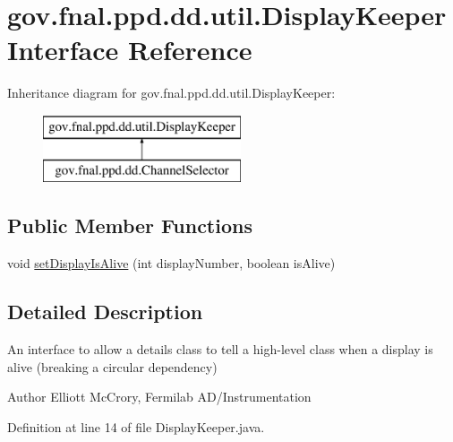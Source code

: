 \hypertarget{interfacegov_1_1fnal_1_1ppd_1_1dd_1_1util_1_1DisplayKeeper}{\section{gov.\-fnal.\-ppd.\-dd.\-util.\-Display\-Keeper Interface Reference}
\label{interfacegov_1_1fnal_1_1ppd_1_1dd_1_1util_1_1DisplayKeeper}
}
Inheritance diagram for gov.\-fnal.\-ppd.\-dd.\-util.\-Display\-Keeper\-:\begin{figure}[H]
\begin{center}
\leavevmode
\includegraphics[height=2.000000cm]{interfacegov_1_1fnal_1_1ppd_1_1dd_1_1util_1_1DisplayKeeper}
\end{center}
\end{figure}
\subsection*{Public Member Functions}
\begin{DoxyCompactItemize}
\item 
void \hyperlink{interfacegov_1_1fnal_1_1ppd_1_1dd_1_1util_1_1DisplayKeeper_a6af1f9ba442235e65e2d333ea7b28be3}{set\-Display\-Is\-Alive} (int display\-Number, boolean is\-Alive)
\end{DoxyCompactItemize}


\subsection{Detailed Description}
An interface to allow a details class to tell a high-\/level class when a display is alive (breaking a circular dependency)

\begin{DoxyAuthor}{Author}
Elliott Mc\-Crory, Fermilab A\-D/\-Instrumentation 
\end{DoxyAuthor}


Definition at line 14 of file Display\-Keeper.\-java.



